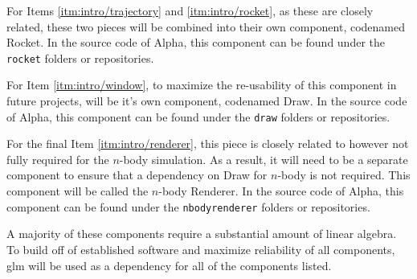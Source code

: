 For Items \ref{itm:intro/trajectory} and \ref{itm:intro/rocket}, as these are
closely related, these two pieces will be combined into their own component,
codenamed Rocket. In the source code of Alpha, this component can be found under
the \texttt{rocket} folders or repositories.

For Item \ref{itm:intro/window}, to maximize the re-usability of this component
in future projects, will be it's own component, codenamed Draw. In the source
code of Alpha, this component can be found under the \texttt{draw} folders or
repositories.

For the final Item \ref{itm:intro/renderer}, this piece is closely related to
however not fully required for the $n$-body simulation. As a result, it will
need to be a separate component to ensure that a dependency on Draw for $n$-body
is not required. This component will be called the $n$-body Renderer. In the
source code of Alpha, this component can be found under the
\texttt{nbodyrenderer} folders or repositories.

A majority of these components require a substantial amount of linear algebra.
To build off of established software and maximize reliability of all components,
glm will be used as a dependency for all of the components listed.

